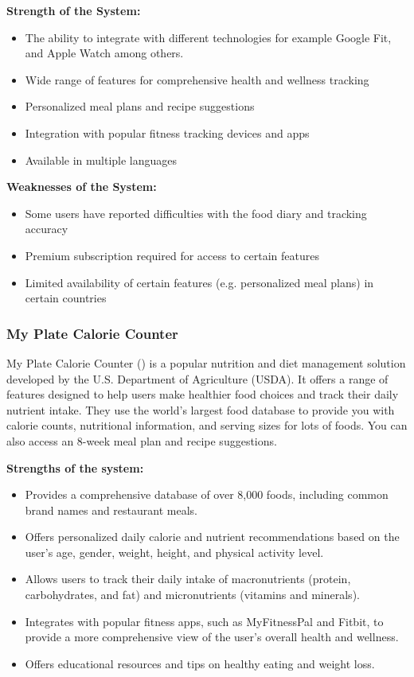 \documentclass{article}
\begin{document}
\textbf{Strength of the System:}
\begin{itemize}
\item The ability to integrate with different technologies for example Google Fit, and Apple Watch among others.
\item Wide range of features for comprehensive health and wellness tracking
\item Personalized meal plans and recipe suggestions
\item Integration with popular fitness tracking devices and apps
\item Available in multiple languages
\end{itemize}

\textbf{Weaknesses of the System:}
\begin{itemize}
\item Some users have reported difficulties with the food diary and tracking accuracy
\item Premium subscription required for access to certain features
\item Limited availability of certain features (e.g. personalized meal plans) in certain countries
\end{itemize}

\subsubsection{My Plate Calorie Counter}

My Plate Calorie Counter (\cite{myplate}) is a popular nutrition and diet management solution developed by the U.S. Department of Agriculture (USDA). It offers a range of features designed to help users make healthier food choices and track their daily nutrient intake. They use the world’s largest food database to provide you with calorie counts, nutritional information, and serving sizes for lots of foods. You can also access an 8-week meal plan and recipe suggestions.

\textbf{Strengths of the system:}
\begin{itemize}

\item Provides a comprehensive database of over 8,000 foods, including common brand names and restaurant meals.
\item Offers personalized daily calorie and nutrient recommendations based on the user's age, gender, weight, height, and physical activity level.
\item Allows users to track their daily intake of macronutrients (protein, carbohydrates, and fat) and micronutrients (vitamins and minerals).
\item Integrates with popular fitness apps, such as MyFitnessPal and Fitbit, to provide a more comprehensive view of the user's overall health and wellness.
\item Offers educational resources and tips on healthy eating and weight loss.

\end{itemize}
\end{document}
